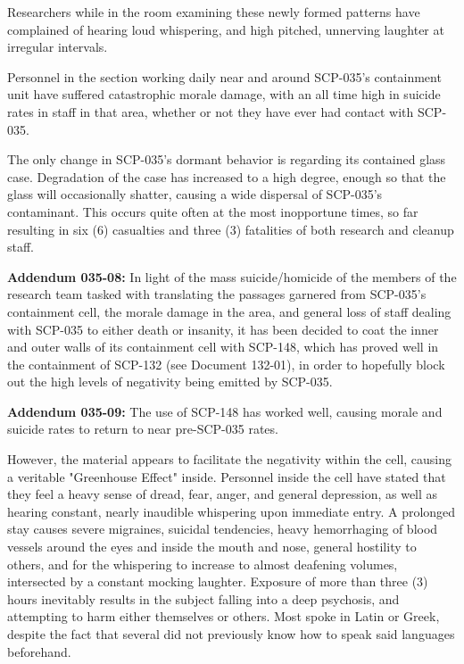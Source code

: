 Researchers while in the room examining these newly formed patterns have complained of hearing loud whispering, and high pitched, unnerving laughter at irregular intervals.

Personnel in the section working daily near and around SCP-035's containment unit have suffered catastrophic morale damage, with an all time high in suicide rates in staff in that area, whether or not they have ever had contact with SCP-035.

The only change in SCP-035's dormant behavior is regarding its contained glass case. Degradation of the case has increased to a high degree, enough so that the glass will occasionally shatter, causing a wide dispersal of SCP-035's contaminant. This occurs quite often at the most inopportune times, so far resulting in six (6) casualties and three (3) fatalities of both research and cleanup staff.

\textbf{Addendum 035-08:} In light of the mass suicide/homicide of the members of the research team tasked with translating the passages garnered from SCP-035's containment cell, the morale damage in the area, and general loss of staff dealing with SCP-035 to either death or insanity, it has been decided to coat the inner and outer walls of its containment cell with SCP-148, which has proved well in the containment of SCP-132 (see Document 132-01), in order to hopefully block out the high levels of negativity being emitted by SCP-035.

\textbf{Addendum 035-09:} The use of SCP-148 has worked well, causing morale and suicide rates to return to near pre-SCP-035 rates.

However, the material appears to facilitate the negativity within the cell, causing a veritable "Greenhouse Effect" inside. Personnel inside the cell have stated that they feel a heavy sense of dread, fear, anger, and general depression, as well as hearing constant, nearly inaudible whispering upon immediate entry. A prolonged stay causes severe migraines, suicidal tendencies, heavy hemorrhaging of blood vessels around the eyes and inside the mouth and nose, general hostility to others, and for the whispering to increase to almost deafening volumes, intersected by a constant mocking laughter. Exposure of more than three (3) hours inevitably results in the subject falling into a deep psychosis, and attempting to harm either themselves or others. Most spoke in Latin or Greek, despite the fact that several did not previously know how to speak said languages beforehand.

